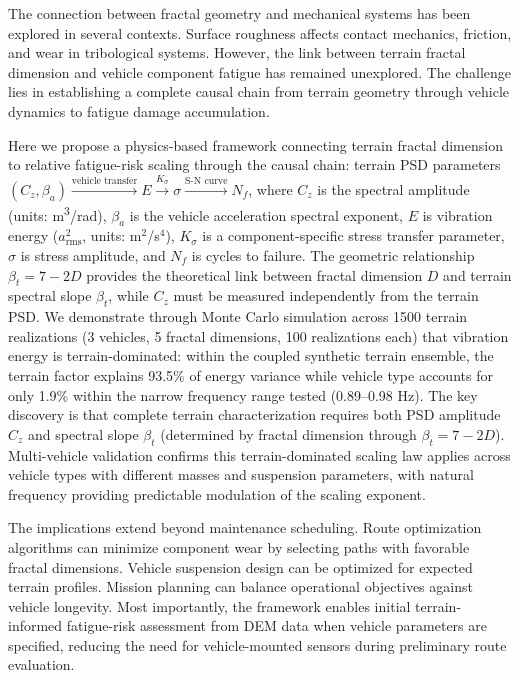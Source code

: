 \documentclass[11pt]{article}
\begin{document}
The connection between fractal geometry and mechanical systems has been explored in several contexts. Surface roughness affects contact mechanics, friction, and wear in tribological systems\cite{Persson2005}. However, the link between terrain fractal dimension and vehicle component fatigue has remained unexplored. The challenge lies in establishing a complete causal chain from terrain geometry through vehicle dynamics to fatigue damage accumulation.

Here we propose a physics-based framework connecting terrain fractal dimension to relative fatigue-risk scaling through the causal chain: terrain PSD parameters $(C_z, \beta_a) \xrightarrow{\text{vehicle transfer}} E \xrightarrow{K_\sigma} \sigma \xrightarrow{\text{S-N curve}} N_f$, where $C_z$ is the spectral amplitude (units: m\textsuperscript{3}/rad), $\beta_a$ is the vehicle acceleration spectral exponent, $E$ is vibration energy ($a_{\mathrm{rms}}^2$, units: m$^2$/s$^4$), $K_\sigma$ is a component-specific stress transfer parameter, $\sigma$ is stress amplitude, and $N_f$ is cycles to failure. The geometric relationship $\beta_t = 7-2D$ provides the theoretical link between fractal dimension $D$ and terrain spectral slope $\beta_t$, while $C_z$ must be measured independently from the terrain PSD. We demonstrate through Monte Carlo simulation across 1500 terrain realizations (3 vehicles, 5 fractal dimensions, 100 realizations each) that vibration energy is terrain-dominated: within the coupled synthetic terrain ensemble, the terrain factor explains 93.5\% of energy variance while vehicle type accounts for only 1.9\% within the narrow frequency range tested (0.89--0.98 Hz). The key discovery is that complete terrain characterization requires both PSD amplitude $C_z$ and spectral slope $\beta_t$ (determined by fractal dimension through $\beta_t = 7-2D$). Multi-vehicle validation confirms this terrain-dominated scaling law applies across vehicle types with different masses and suspension parameters, with natural frequency providing predictable modulation of the scaling exponent.

The implications extend beyond maintenance scheduling. Route optimization algorithms can minimize component wear by selecting paths with favorable fractal dimensions. Vehicle suspension design can be optimized for expected terrain profiles. Mission planning can balance operational objectives against vehicle longevity. Most importantly, the framework enables initial terrain-informed fatigue-risk assessment from DEM data when vehicle parameters are specified, reducing the need for vehicle-mounted sensors during preliminary route evaluation.
\end{document}
